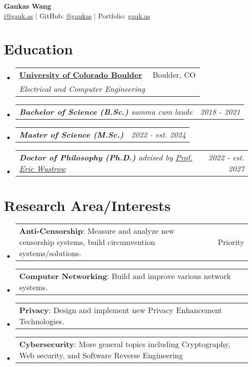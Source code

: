 \documentclass[letterpaper,11pt]{article}
\makeatletter
\newcommand{\resumeSubheading}[4]{
  \vspace{-2pt}\item
    \begin{tabular*}{0.97\textwidth}[t]{l@{\extracolsep{\fill}}r}
      \textbf{#1} & #2 \\
      \textit{\small#3} & \textit{\small #4} \\
    \end{tabular*}\vspace{-7pt}
}
\newcommand{\resumeSubSubheading}[2]{
    \item
    \begin{tabular*}{0.97\textwidth}{l@{\extracolsep{\fill}}r}
      \textit{\small#1} & \textit{\small #2} \\
    \end{tabular*}\vspace{-7pt}
}
\newcommand{\resumeProjectHeading}[2]{
    \item
    \begin{tabular*}{0.97\textwidth}{l@{\extracolsep{\fill}}r}
      \small#1 & #2 \\
    \end{tabular*}\vspace{-7pt}
}
\newcommand{\resumeSubHeadingListStart}{\begin{itemize}[leftmargin=0.15in, label={}]}
\newcommand{\resumeSubHeadingListEnd}{\end{itemize}}
\makeatother
\begin{document}
\begin{center}
  {\textbf{\Huge Gaukas Wang}} \\ \vspace{4pt}
    \href{mailto:i@gauk.as}{{i@gauk.as}} $|$ 
    GitHub: \href{https://github.com/gaukas}{@gaukas} $|$ 
    Portfolio: \href{https://gauk.as}{gauk.as}
\end{center}


\section{Education}
\resumeSubHeadingListStart
\resumeSubheading
{\href{https://colorado.edu}{University of Colorado Boulder}}{Boulder, CO}
{Electrical and Computer Engineering}{}
\resumeSubSubheading
{
  \em{\textbf{Bachelor of Science (B.Sc.)}} \textit{summa cum laude}
}{2018 - 2021}
\resumeSubSubheading
{
  \em{}\textbf{Master of Science (M.Sc.)} %
}{2022 - est. 2024}
\resumeSubSubheading
{
  \em{}\textbf{Doctor of Philosophy (Ph.D.)} 
  {advised by \href{https://ericw.us/trow}{Prof. Eric Wustrow}}
}{2022 - est. 2027}
\resumeSubHeadingListEnd

\vspace{1pt}

\section{Research Area/Interests}
\resumeSubHeadingListStart
  \resumeProjectHeading {\textbf{Anti-Censorship}: Measure and analyze new censorship systems, build circumvention systems/solutions.}{Priority}
  \resumeProjectHeading {\textbf{Computer Networking}: Build and improve various network systems.}{}
  \resumeProjectHeading {\textbf{Privacy}: Design and implement new Privacy Enhancement Technologies.}{}
  \resumeProjectHeading {\textbf{Cybersecurity}: More general topics including Cryptography, Web security, and Software Reverse Engineering}{}
\resumeSubHeadingListEnd
\vspace{1pt}

\end{document}
